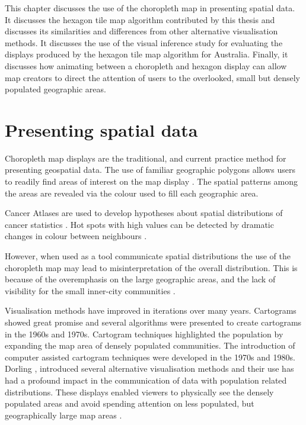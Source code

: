 \documentclass{monashthesis}
\begin{document}
This chapter discusses the use of the choropleth map in presenting spatial data.
It discusses the hexagon tile map algorithm contributed by this thesis and discusses its similarities and differences from other alternative visualisation methods.
It discusses the use of the visual inference study for evaluating the displays produced by the hexagon tile map algorithm for Australia. Finally, it discusses how animating between a choropleth and hexagon display can allow map creators to direct the attention of users to the overlooked, small but densely populated geographic areas.

\hypertarget{presenting-spatial-data}{%
\section{Presenting spatial data}\label{presenting-spatial-data}}

Choropleth map displays are the traditional, and current practice method for presenting geospatial data. The use of familiar geographic polygons allows users to readily find areas of interest on the map display \autocite{EI}. The spatial patterns among the areas are revealed via the colour used to fill each geographic area.

Cancer Atlases are used to develop hypotheses about spatial distributions of cancer statistics \autocite{CPISACA}. Hot spots with high values can be detected by dramatic changes in colour between neighbours \autocite{MACM}.

However, when used as a tool communicate spatial distributions the use of the choropleth map may lead to misinterpretation of the overall distribution. This is because of the overemphasis on the large geographic areas, and the lack of visibility for the small inner-city communities \autocite{ACTUC}.

Visualisation methods have improved in iterations over many years. Cartograms \autocite{ACCAC} showed great promise and several algorithms were presented to create cartograms in the 1960s and 1970s. Cartogram techniques highlighted the population by expanding the map area of densely populated communities.
The introduction of computer assisted cartogram techniques were developed in the 1970s and 1980s. Dorling \autocite{TVSSS}, \autocite{ACTUC} introduced several alternative visualisation methods and their use has had a profound impact in the communication of data with population related distributions. These displays enabled viewers to physically see the densely populated areas and avoid spending attention on less populated, but geographically large map areas \autocite{CTTMB}.
\end{document}
